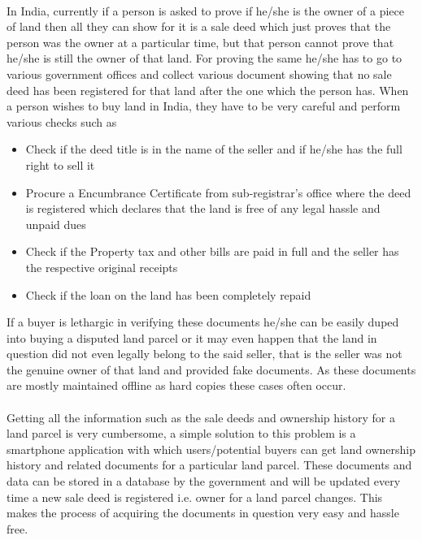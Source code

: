 \documentclass{article}
\begin{document}
        \paragraph{}
        In India, currently if a person is asked to prove if he/she is the owner of a piece of land then all they can show for it is a sale deed which just proves that the person was the owner at a particular time, but that person cannot prove that he/she is still the owner of that land. For proving the same he/she has to go to various government offices and collect various document showing that no sale deed has been registered for that land after the one which the person has. When a person wishes to buy land in India, they have to be very careful and perform various checks such as
        \begin{itemize}
            \item Check if the deed title is in the name of the seller and if he/she has the full right to sell it
            \item Procure a Encumbrance Certificate from sub-registrar's office where the deed is registered which declares that the land is free of any legal hassle and unpaid dues
            \item Check if the Property tax and other bills are paid in full and the seller has the respective original receipts
            \item Check if the loan on the land has been completely repaid
        \end{itemize}
        If a buyer is lethargic in verifying these documents he/she can be easily duped into buying a disputed land parcel or it may even happen that the land in question did not even legally belong to the said seller, that is the seller was not the genuine owner of that land and provided fake documents. As these documents are mostly maintained offline as hard copies these cases often occur.

        \paragraph{}
        Getting all the information such as the sale deeds and ownership history for a land parcel is very cumbersome, a simple solution to this problem is a smartphone application with which users/potential buyers can get land ownership history and related documents for a particular land parcel. These documents and data can be stored in a database by the government and will be updated every time a new sale deed is registered i.e. owner for a land parcel changes. This makes the process of acquiring the documents in question very easy and hassle free.
\end{document}
